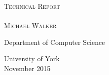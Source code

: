 \begin{titlepage}
\begin{center}

\textsc{\LARGE \dejafu{} Technical Report}\\[0.25cm]

\small{}\\[1.5cm]

\textsc{\large Michael Walker}\\[1,5cm]

\vfill

Department of Computer Science\par
University of York \\[1,3cm]

November 2015


\end{center}
\end{titlepage}